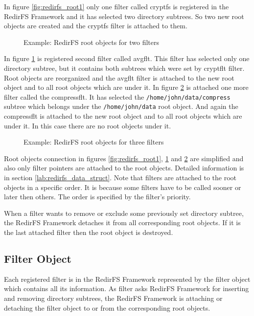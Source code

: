 In figure \ref{fig:redirfs_root1} only one filter called cryptfs is registered in
the RedirFS Framework and it has selected two directory subtrees. So two new root
objects are created and the cryptfs filter is attached to them.

\begin{figure}[hp]
	\begin{center}
		
	\end{center}
	\caption{Example: RedirFS root objects for two filters}
	\label{fig:redirfs_root2}
\end{figure}

In figure \ref{fig:redirfs_root2} is registered second filter called avgflt. This
filter has selected only one directory subtree, but it contains both 
subtrees which were set by cryptflt filter. Root objects are reorganized and the
avgflt filter is attached to the new root object and to all root objects which are under it.
In figure \ref{fig:redirfs_root3} is attached one more filter called the compressflt. It
has selected the \texttt{/home/john/data/compress} subtree which belongs under
the
\texttt{/home/john/data} root object. And again the compressflt is attached to the new
root object and to all root objects which are under it. In this case there are no root
objects under it.

\begin{figure}[hp]
	\begin{center}
		
	\end{center}
	\caption{Example: RedirFS root objects for three filters}
	\label{fig:redirfs_root3}
\end{figure}

Root objects connection in figures \ref{fig:redirfs_root1}, \ref{fig:redirfs_root2}
and \ref{fig:redirfs_root3} are simplified and also only filter pointers are attached
to the root objects. Detailed information is in section
\ref{lab:redirfs_data_struct}. Note that filters are attached to the root
objects in a
specific order. It is because some filters have to be called sooner or later then
others. The order is specified by the filter's priority.

When a filter wants to remove or exclude some previously set directory subtree, the
RedirFS Framework detaches it from all corresponding root objects. If it is the last
attached filter then the root object is destroyed.

\subsection{Filter Object}
Each registered filter is in the RedirFS Framework represented by the filter object
which contains all its information. As filter asks RedirFS Framework for inserting and
removing directory subtrees, the RedirFS Framework is attaching or detaching the
filter object
to or from the corresponding root objects.

